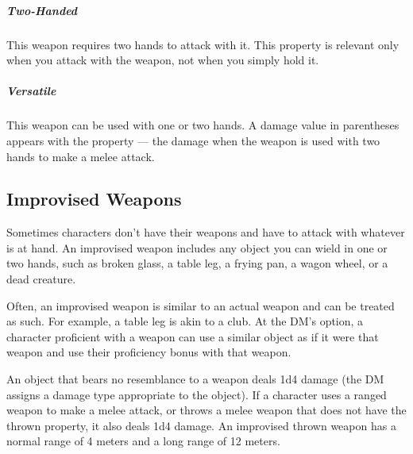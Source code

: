     \subparagraph{Two-Handed}
        This weapon requires two hands to attack with it.
        This property is relevant only when you attack with the weapon, not when you simply hold it.
    \subparagraph{Versatile}
        This weapon can be used with one or two hands.
        A damage value in parentheses appears with the property --- the damage when the weapon is used with two hands to make a melee attack.

\subsection*{Improvised Weapons} \label{ssec::improvisedweapons}
    Sometimes characters don't have their weapons and have to attack with whatever is at hand.
    An improvised weapon includes any object you can wield in one or two hands, such as broken glass, a table leg, a frying pan, a wagon wheel, or a dead creature.

    Often, an improvised weapon is similar to an actual weapon and can be treated as such.
    For example, a table leg is akin to a club.
    At the DM's option, a character proficient with a weapon can use a similar object as if it were that weapon and use their proficiency bonus with that weapon.

    An object that bears no resemblance to a weapon deals 1d4 damage (the DM assigns a damage type appropriate to the object).
    If a character uses a ranged weapon to make a melee attack, or throws a melee weapon that does not have the thrown property, it also deals 1d4 damage.
    An improvised thrown weapon has a normal range of 4 meters and a long range of 12 meters.
